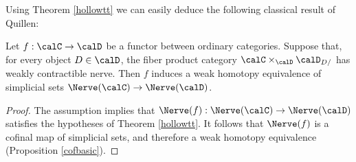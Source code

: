 Using Theorem \ref{hollowtt} we can easily deduce the following classical result of Quillen:

\begin{corollary}
Let $f: \calC \rightarrow \calD$ be a functor between ordinary categories. Suppose that, for
every object $D \in \calD$, the fiber product category $\calC \times_{\calD} \calD_{D/}$ has
weakly contractible nerve. Then $f$ induces a weak homotopy equivalence of simplicial sets
$\Nerve(\calC) \rightarrow \Nerve(\calD)$.
\end{corollary}

\begin{proof}
The assumption implies that $\Nerve(f): \Nerve(\calC) \rightarrow \Nerve(\calD)$ satisfies the hypotheses of Theorem \ref{hollowtt}. It follows that $\Nerve(f)$ is a cofinal map of simplicial sets, and therefore a weak homotopy equivalence (Proposition \ref{cofbasic}).
\end{proof}

